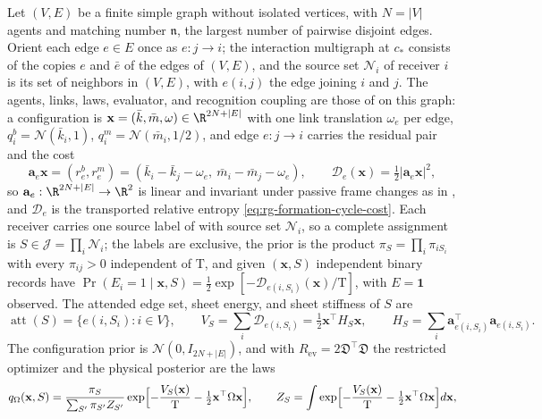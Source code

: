 Let \((V,E)\) be a finite simple graph without isolated vertices, with
\(N=|V|\) agents and matching number \(\mathfrak n\), the largest number of
pairwise disjoint edges. Orient each edge \(e\in E\) once as \(e:j\to i\); the
interaction multigraph at \(c_*\) consists of the copies \(e\) and \(\bar e\)
of the edges of \((V,E)\), and the source set \(\mathcal N_i\) of receiver \(i\)
is its set of neighbors in \((V,E)\), with \(e(i,j)\) the edge joining \(i\) and
\(j\). The agents, links, laws, evaluator, and recognition coupling are those
of  on this graph: a configuration is
\(\mathbf x=(\bar k,\bar m,\omega)\in\R^{2N+|E|}\) with one link translation
\(\omega_e\) per edge, \(q_i^b=\mathcal N(\bar k_i,1)\),
\(q_i^m=\mathcal N(\bar m_i,1/2)\), and edge \(e:j\to i\) carries the residual
pair and the cost
\begin{equation}
\mathbf a_e\mathbf x=(r^b_e,r^m_e)
=(\bar k_i-\bar k_j-\omega_e,\ \bar m_i-\bar m_j-\omega_e),
\qquad
\mathcal D_e(\mathbf x)=\tfrac12|\mathbf a_e\mathbf x|^2,
\label{eq:rg-gated-residual-pair}
\end{equation}
so \(\mathbf a_e:\R^{2N+|E|}\to\R^2\) is linear and invariant under passive
frame changes as in , and \(\mathcal D_e\) is
the transported relative entropy \cref{eq:rg-formation-cycle-cost}. Each
receiver carries one source label of 
with source set \(\mathcal N_i\), so a complete assignment is
\(S\in\mathcal J=\prod_i\mathcal N_i\); the labels are exclusive, the prior is
the product \(\pi_S=\prod_i\pi_{iS_i}\) with every \(\pi_{ij}>0\) independent
of \(\mathrm T\), and given \((\mathbf x,S)\) independent binary records have
\(\Pr(E_i=1\mid\mathbf x,S)=\tfrac12\exp[-\mathcal D_{e(i,S_i)}(\mathbf x)/\mathrm T]\),
with \(E=\mathbf 1\) observed. The attended edge set, sheet energy, and sheet
stiffness of \(S\) are
\begin{equation}
\operatorname{att}(S)=\{e(i,S_i):i\in V\},\qquad
V_S=\sum_i\mathcal D_{e(i,S_i)}=\tfrac12\mathbf x^\top H_S\mathbf x,\qquad
H_S=\sum_i\mathbf a_{e(i,S_i)}^\top\mathbf a_{e(i,S_i)}.
\label{eq:rg-gated-sheet-stiffness}
\end{equation}
The configuration prior is \(\mathcal N(0,I_{2N+|E|})\), and with
\(R_{\mathrm{ev}}=2\mathfrak D^\top\mathfrak D\) the restricted optimizer and
the physical posterior are the laws
\begin{equation}
q_\Omega(\mathbf x,S)=\frac{\pi_S}{\sum_{S'}\pi_{S'}Z_{S'}}
\exp\Bigl[-\frac{V_S(\mathbf x)}{\mathrm T}-\tfrac12\mathbf x^\top\Omega\mathbf x\Bigr],
\qquad
Z_S=\int\exp\Bigl[-\frac{V_S(\mathbf x)}{\mathrm T}-\tfrac12\mathbf x^\top\Omega\mathbf x\Bigr]d\mathbf x,
\label{eq:rg-gated-sheet-law}
\end{equation}
